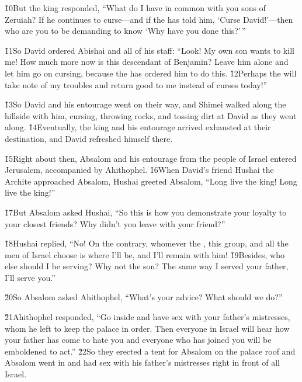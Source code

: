 \v{10}But the king responded, ``What do I have in common with you sons of Zeruiah? If he continues to curse---and if the  has told him, `Curse David!'---then who are you to be demanding to know `Why have you done this?'\,''

\v{11}So David ordered Abishai and all of his staff: ``Look! My own son wants to kill me! How much more now is this descendant of Benjamin? Leave him alone and let him go on cursing, because the  has ordered him to do this. \v{12}Perhaps the  will take note of my troubles and return good to me instead of curses today!''

\v{13}So David and his entourage went on their way, and Shimei walked along the hillside with him, cursing, throwing rocks, and tossing dirt at David as they went along. \v{14}Eventually, the king and his entourage arrived exhausted at their destination, and David refreshed himself there.

\v{15}Right about then, Absalom and his entourage from the people of Israel entered Jerusalem, accompanied by Ahithophel. \v{16}When David's friend Hushai the Archite approached Absalom, Hushai greeted Absalom, ``Long live the king! Long live the king!''

\v{17}But Absalom asked Hushai, ``So this is how you demonstrate your loyalty to your closest friends? Why didn't you leave with your friend?''

\v{18}Hushai replied, ``No! On the contrary, whomever the , this group, and all the men of Israel choose is where I'll be, and I'll remain with him! \v{19}Besides, who else should I be serving? Why not the son? The same way I served your father, I'll serve you.''

\v{20}So Absalom asked Ahithophel, ``What's your advice? What should we do?''

\v{21}Ahithophel responded, ``Go inside and have sex with your father's mistresses, whom he left to keep the palace in order. Then everyone in Israel will hear how your father has come to hate you and everyone who has joined you will be emboldened to act.'' \v{22}So they erected a tent for Absalom on the palace roof and Absalom went in and had sex with his father's mistresses right in front of all Israel.

